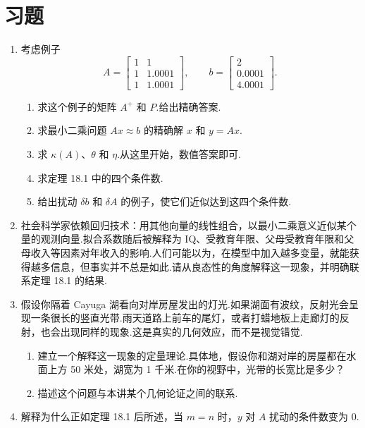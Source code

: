 \documentclass[UTF8,fontset=none,12pt]{ctexart}
\theoremstyle{definition}
\begin{document}
\section*{习题}

\begin{enumerate}[label=\textbf{18.\arabic*}]
    \item 考虑例子
    \[
    A=\begin{bmatrix}1&1\\1&1.0001\\1&1.0001\end{bmatrix},
    \qquad
    b=\begin{bmatrix}2\\0.0001\\4.0001\end{bmatrix}.
    \]
    \begin{enumerate}[label=(\alph*)]
        \item 求这个例子的矩阵 $A^+$ 和 $P$.给出精确答案.
        \item 求最小二乘问题 $Ax\approx b$ 的精确解 $x$ 和 $y=Ax$.
        \item 求 $\kappa(A)$、$\theta$ 和 $\eta$.从这里开始，数值答案即可.
        \item 求定理 18.1 中的四个条件数.
        \item 给出扰动 $\delta b$ 和 $\delta A$ 的例子，使它们近似达到这四个条件数.
    \end{enumerate}

    \item 社会科学家依赖回归技术：用其他向量的线性组合，以最小二乘意义近似某个量的观测向量.拟合系数随后被解释为 IQ、受教育年限、父母受教育年限和父母收入等因素对年收入的影响.人们可能以为，在模型中加入越多变量，就能获得越多信息，但事实并不总是如此.请从良态性的角度解释这一现象，并明确联系定理 18.1 的结果.

    \item 假设你隔着 Cayuga 湖看向对岸房屋发出的灯光.如果湖面有波纹，反射光会呈现一条很长的竖直光带.雨天道路上前车的尾灯，或者打蜡地板上走廊灯的反射，也会出现同样的现象.这是真实的几何效应，而不是视觉错觉.
    \begin{enumerate}[label=(\alph*)]
        \item 建立一个解释这一现象的定量理论.具体地，假设你和湖对岸的房屋都在水面上方 50 米处，湖宽为 1 千米.在你的视野中，光带的长宽比是多少？
        \item 描述这个问题与本讲某个几何论证之间的联系.
    \end{enumerate}

    \item 解释为什么正如定理 18.1 后所述，当 $m=n$ 时，$y$ 对 $A$ 扰动的条件数变为 0.
\end{enumerate}
\end{document}
